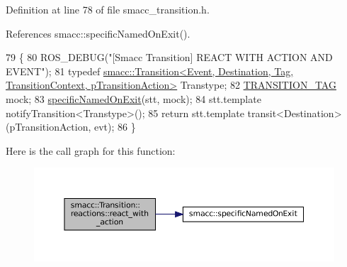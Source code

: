 Definition at line 78 of file smacc\+\_\+transition.\+h.



References smacc\+::specific\+Named\+On\+Exit().


\begin{DoxyCode}
79     \{
80       ROS\_DEBUG(\textcolor{stringliteral}{"[Smacc Transition] REACT WITH ACTION AND EVENT"});
81       \textcolor{keyword}{typedef} 
      \hyperlink{classsmacc_1_1Transition}{smacc::Transition<Event, Destination, Tag, TransitionContext, pTransitionAction>}
       Transtype;
82       \hyperlink{classsmacc_1_1Transition_a672e883135344c4aea140381dd4d1c1d}{TRANSITION\_TAG} mock;
83       \hyperlink{namespacesmacc_afd94fcb8f8c410a0ced7954bf76e845d}{specificNamedOnExit}(stt, mock);
84       stt.template notifyTransition<Transtype>();
85       \textcolor{keywordflow}{return} stt.template transit<Destination>(pTransitionAction, evt);
86     \}
\end{DoxyCode}
Here is the call graph for this function\+:
\nopagebreak
\begin{figure}[H]
\begin{center}
\leavevmode
\includegraphics[width=350pt]{structsmacc_1_1Transition_1_1reactions_a843ddc3d10e2aec66a702745852455c3_cgraph}
\end{center}
\end{figure}
\mbox{\label{structsmacc_1_1Transition_1_1reactions_a96a69cf5b0cbd1e8fc49ca57efb37581}} 
